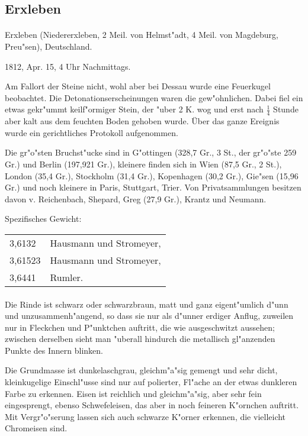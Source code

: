 \documentclass[a4paper, 11pt, oneside]{article}
\begin{document}
\subsection{Erxleben}
\normalsize
\paragraph{}
Erxleben (Niedererxleben, 2 Meil. von Helmst"adt, 4 Meil. von Magdeburg, Preu"sen), Deutschland.

1812, Apr. 15, 4 Uhr Nachmittags.

Am Fallort der Steine nicht, wohl aber bei Dessau wurde eine Feuerkugel beobachtet. Die Detonationserscheinungen waren die gew"ohnlichen. Dabei fiel ein etwas gekr"ummt keilf"ormiger Stein, der "uber 2 K. wog und erst nach $\frac{1}{4}$ Stunde aber kalt aus dem feuchten Boden gehoben wurde. Über das ganze Ereignis wurde ein gerichtliches Protokoll aufgenommen.

Die gr"o"sten Bruchst"ucke sind in G"ottingen (328,7 Gr., 3 St., der gr"o"ste 259 Gr.) und Berlin (197,921 Gr.), kleinere finden sich in Wien (87,5 Gr., 2 St.), London (35,4 Gr.), Stockholm (31,4 Gr.), Kopenhagen (30,2 Gr.), Gie"sen (15,96 Gr.) und noch kleinere in Paris, Stuttgart, Trier. Von Privatsammlungen besitzen davon v. Reichenbach, Shepard, Greg (27,9 Gr.), Krantz und Neumann.

Spezifisches Gewicht:
\begin{table}[!ht]
    \centering
    \begin{tabular}{l l}
        3,6132 & Hausmann und Stromeyer,\\
        3,61523 & Hausmann und Stromeyer,\\
        3,6441 & Rumler.
    \end{tabular}
\end{table}
\paragraph{}
Die Rinde ist schwarz oder schwarzbraun, matt und ganz eigent"umlich d"unn und unzusammenh"angend, so dass sie nur als d"unner erdiger Anflug, zuweilen nur in Fleckchen und P"unktchen auftritt, die wie ausgeschwitzt aussehen; zwischen derselben sieht man "uberall hindurch die metallisch gl"anzenden Punkte des Innern blinken.

Die Grundmasse ist dunkelaschgrau, gleichm"a"sig gemengt und sehr dicht, kleinkugelige Einschl"usse sind nur auf polierter, Fl"ache an der etwas dunkleren Farbe zu erkennen. Eisen ist reichlich und gleichm"a"sig, aber sehr fein eingesprengt, ebenso Schwefeleisen, das aber in noch feineren K"ornchen auftritt. Mit Vergr"o"serung lassen sich auch schwarze K"orner erkennen, die vielleicht Chromeisen sind.
\end{document}
